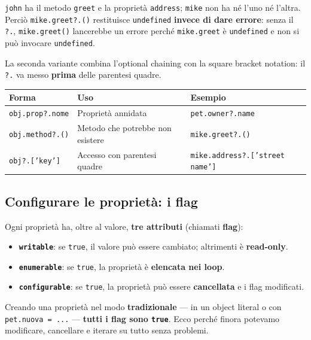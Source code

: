 \documentclass[10pt,a4paper]{article}
\begin{document}
\texttt{john} ha il metodo \texttt{greet} e la proprietà \texttt{address}; \texttt{mike} non ha né l'uno né l'altra. Perciò \texttt{mike.greet?.()} restituisce \texttt{undefined} \textbf{invece di dare errore}: senza il \texttt{?.}, \texttt{mike.greet()} lancerebbe un errore perché \texttt{mike.greet} è \texttt{undefined} e non si può invocare \texttt{undefined}.

La seconda variante combina l'optional chaining con la square bracket notation: il \texttt{?.} va messo \textbf{prima} delle parentesi quadre.

\begin{center}
\small
\begin{tabularx}{\textwidth}{@{}lXX@{}}
\toprule
\textbf{Forma} & \textbf{Uso} & \textbf{Esempio} \\
\midrule
\texttt{obj.prop?.nome} & Proprietà annidata & \texttt{pet.owner?.name} \\
\texttt{obj.method?.()} & Metodo che potrebbe non esistere & \texttt{mike.greet?.()} \\
\texttt{obj?.['key']} & Accesso con parentesi quadre & \texttt{mike.address?.['street name']} \\
\bottomrule
\end{tabularx}
\end{center}

\subsection{Configurare le proprietà: i flag}

Ogni proprietà ha, oltre al valore, \textbf{tre attributi} (chiamati \textbf{flag}):

\begin{itemize}
  \item \textbf{\texttt{writable}}: se \texttt{true}, il valore può essere cambiato; altrimenti è \textbf{read-only}.
  \item \textbf{\texttt{enumerable}}: se \texttt{true}, la proprietà è \textbf{elencata nei loop}.
  \item \textbf{\texttt{configurable}}: se \texttt{true}, la proprietà può essere \textbf{cancellata} e i flag modificati.
\end{itemize}

Creando una proprietà nel modo \textbf{tradizionale} --- in un object literal o con \texttt{pet.nuova = ...} --- \textbf{tutti i flag sono \texttt{true}}. Ecco perché finora potevamo modificare, cancellare e iterare su tutto senza problemi.
\end{document}

